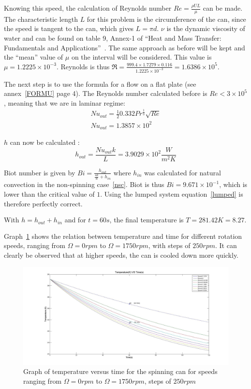\documentclass{report}
\begin{document}
	Knowing this speed, the calculation of Reynolds number $Re=\frac{\rho U L}{\mu}$ can be made. The characteristic length $L$ for this problem is the circumference of the can, since the speed is tangent to the can, which gives $L=\pi d$. $\nu$ is the dynamic viscosity of water and can be found on table 9, Annex-1 of ``Heat and Mass Transfer: Fundamentals and Applications''~\cite{HaMT}. The same approach as before will be kept and the ``mean'' value of $\mu$ on the interval will be considered. This value is $\mu=1.2225\times 10^{-3}$. Reynolds is thus $\Re= \frac{999.4 \times 1.7279 \times 0.116}{1.2225\times 10^{-3}}= 1.6386 \times 10^5$.
	
	The next step is to use the formula for a flow on a flat plate (see annex~\ref{FORMU} page 4). The Reynolds number calculated before is $Re<3\times 10^5$, meaning that we are in laminar regime:
	\begin{equation}
		\begin{gathered}
		Nu_{out}= \frac{1}{2}0.332Pr^{\frac{1}{3}}\sqrt{Re}\\
		Nu_{out}=1.3857\times 10^2
		\end{gathered}
	\end{equation}
	
	$h$ can now be calculated :
	\begin{equation}
	h_{out}=\frac{Nu_{out}k}{L}=3.9029\times 10^2 \frac{W}{m^2K}
	\end{equation}
	
	Biot number is given by $Bi=\frac{h_{out}}{{\frac{4k}{d}+h_{in}}}$ where $h_{in}$ was calculated for natural convection in the non-spinning case~\ref{nsc}. Biot is thus $Bi=9.671\times 10^{-1}$, which is lower than the critical value of $1$. Using the lumped system equation~\ref{lumped} is therefore perfectly correct.

	With $h=h_{out}+h_{in}$ and for $t=60s$, the final temperature is $T=281.42K=8.27$\textcelsius.
	
	Graph~\ref{Sg} shows the relation between temperature and time for different rotation speeds, ranging from $\Omega=0rpm$ to $\Omega=1750rpm$, with steps of $250rpm$. It can clearly be observed that at higher speeds, the can is cooled down more quickly.
	
	\begin{figure}
		\centering
		\includegraphics[width=\textwidth]{img/Sg.jpg}
		\caption{Graph of temperature versus time for the spinning can for speeds ranging from $\Omega=0rpm$ to $\Omega=1750rpm$, steps of $250rpm$}
		\label{Sg}
	\end{figure}
	
\end{document}
